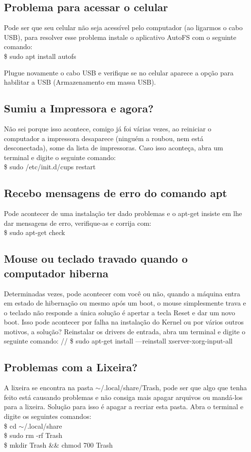\subsection{Problema para acessar o celular}
Pode ser que seu celular não seja acessível pelo computador (ao ligarmos o cabo USB), para resolver esse problema instale o aplicativo AutoFS com o seguinte comando: \\
{\ttfamily\$ sudo apt install autofs}

Plugue novamente o cabo USB e verifique se no celular aparece a opção para habilitar a USB (Armazenamento em massa USB).

\subsection{Sumiu a Impressora e agora?}
Não sei porque isso acontece, comigo já foi várias vezes, ao reiniciar o computador a impressora desaparece (ninguém a roubou, nem está desconectada), some da lista de impressoras. Caso isso aconteça, abra um terminal e digite o seguinte comando: \\
{\ttfamily\$ sudo /etc/init.d/cups restart}

\subsection{Recebo mensagens de erro do comando apt}
Pode acontecer de uma instalação ter dado problemas e o apt-get insiste em lhe dar mensagens de erro, verifique-as e corrija com: \\
{\ttfamily\$ sudo apt-get check}

\subsection{Mouse ou teclado travado quando o computador hiberna}
Determinadas vezes, pode acontecer com você ou não, quando a máquina entra em estado de hibernação ou mesmo após um boot, o mouse simplesmente trava e o teclado não responde a única solução é apertar a tecla Reset e dar um novo boot. Isso pode acontecer por falha na instalação do Kernel ou por vários outros motivos, a solução? Reinstalar os drivers de entrada, abra um terminal e digite o seguinte comando: //
{\ttfamily\$ sudo apt-get install ---reinstall xserver-xorg-input-all}

\subsection{Problemas com a Lixeira?}
A lixeira se encontra na pasta $\sim$/.local/share/Trash, pode ser que algo que tenha feito está causando problemas e não consiga mais apagar arquivos ou mandá-los para a lixeira. Solução para isso é apagar a recriar esta pasta. Abra o terminal e digite os seguintes comandos: \\
{\ttfamily\$ cd $\sim$/.local/share \\
\$ sudo rm -rf Trash \\
\$ mkdir Trash \&\& chmod 700 Trash}

